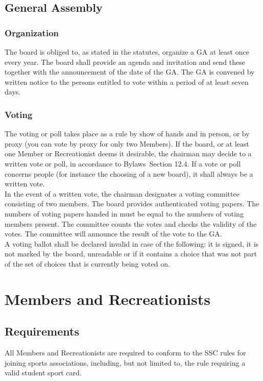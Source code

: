 \documentclass[a4paper]{article}
\newcommand{\Asta}{Bylaws} %
\begin{document}
\subsection{General Assembly}
\subsubsection{Organization}
The board is obliged to, as stated in the statutes, organize a GA at least once every year.  The board shall provide an agenda and invitation and send these together with the announcement of the date of the GA. The GA is convened by written notice to the persons entitled to vote within a period of at least seven days.  

\subsubsection{Voting}
The voting or poll takes place as a rule by show of hands and in person, or by proxy (you can vote by proxy for only two Members). If the board, or at least one Member or Recreationist deems it desirable, the chairman may decide to a written vote or poll, in accordance to \Asta\ Section 12.4. If a vote or poll concerns people (for instance the choosing of a new board), it shall always be a written vote. \\ 

In the event of a written vote, the chairman designates a voting committee consisting of two members. The board provides authenticated voting papers. The numbers of voting papers handed in must be equal to the numbers of voting members present. The committee counts the votes and checks the validity of the votes. The committee will announce the result of the vote to the GA. \\

A voting ballot shall be declared invalid in case of the following: it is signed, it is not marked by the board, unreadable or if it contains a choice that was not part of the set of choices that is currently being voted on.

\pagebreak

\section{Members and Recreationists}
\subsection{Requirements}
All Members and Recreationists are required to conform to the SSC rules for joining sports associations, including, but not limited to, the rule requiring a valid student sport card.
\end{document}
